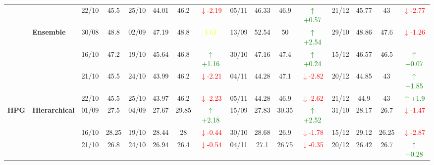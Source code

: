 \documentclass{ieeeaccess}
\begin{document}
{\begin{longtable}{llcc|cccc|cccc|cccc}
&
& 22/10 & 45.5 & 25/10 & 44.01 & 46.2 & \textcolor{red}{\(\downarrow\)-2.19} & 05/11 & 46.33 & 46.9 & \textcolor{green}{\(\uparrow\)+0.57} & 21/12 & 45.77 & 43 & \textcolor{red}{\(\downarrow\)-2.77} \\
\cmidrule(lr){2-16}



& \textbf{Ensemble}
& 30/08 & 48.8 & 02/09 & 47.19 & 48.8 & \textcolor{yellow}{1.61} & 13/09 & 52.54 & 50 & \textcolor{green}{\(\uparrow\)+2.54} & 29/10 & 48.86 & 47.6 & \textcolor{red}{\(\downarrow\)-1.26} \\

&
& 16/10 & 47.2 & 19/10 & 45.64 & 46.8 & \textcolor{green}{\(\uparrow\)+1.16} & 30/10 & 47.16 & 47.4 & \textcolor{green}{\(\uparrow\)+0.24} & 15/12 & 46.57 & 46.5 & \textcolor{green}{\(\uparrow\)+0.07} \\

&
& 21/10 & 45.5 & 24/10 & 43.99 & 46.2 & \textcolor{red}{\(\downarrow\)-2.21} & 04/11 & 44.28 & 47.1 & \textcolor{red}{\(\downarrow\)-2.82} & 20/12 & 44.85 & 43 & \textcolor{green}{\(\uparrow\)+1.85} \\

&
& 22/10 & 45.5 & 25/10 & 43.97 & 46.2 & \textcolor{red}{\(\downarrow\)-2.23} & 05/11 & 44.28 & 46.9 & \textcolor{red}{\(\downarrow\)-2.62} & 21/12 & 44.9 & 43 & \textcolor{green}{\(\uparrow\)+1.9}  \\
\midrule


\multirow{12}{*}{\textbf{HPG}} 
& \textbf{Hierarchical}
& 01/09 & 27.5 & 04/09 & 27.67 & 29.85 & \textcolor{green}{\(\uparrow\)+2.18} & 15/09 & 27.83 & 30.35 & \textcolor{green}{\(\uparrow\)+2.52} & 31/10 & 28.17 & 26.7 & \textcolor{red}{\(\downarrow\)-1.47} \\

& 
& 16/10 & 28.25 & 19/10 & 28.44 & 28 & \textcolor{red}{\(\downarrow\)-0.44} & 30/10 & 28.68 & 26.9 & \textcolor{red}{\(\downarrow\)-1.78} & 15/12 & 29.12 & 26.25 & \textcolor{red}{\(\downarrow\)-2.87} \\

& 
& 21/10 & 26.8 & 24/10 & 26.94 & 26.4 & \textcolor{red}{\(\downarrow\)-0.54} & 04/11 & 27.1 & 26.75 & \textcolor{red}{\(\downarrow\)-0.35} & 20/12 & 26.42 & 26.7 & \textcolor{green}{\(\uparrow\)+0.28} \\


\end{longtable}}
\end{document}
